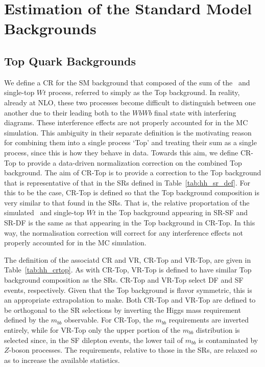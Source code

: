 \section{Estimation of the Standard Model Backgrounds}
\label{sec:hh_background_estimate}

%
%

\subsection{Top Quark Backgrounds}
\label{sec:cr_top}

We define a CR for the SM background that composed of the sum of the \ttbar~and single-top $Wt$
process, referred to simply as the Top background.
In reality, already at NLO, these two processes become difficult to distinguish between one another
due to their leading both to the $WbWb$ final state with interfering diagrams.
These interference effects are not properly accounted for in the MC simulation.
This ambiguity in their separate definition is the motivating reason for combining them into a single
process `Top' and treating their sum as a single process, since this is how they behave in data.
Towards this aim, we define CR-Top to provide a data-driven normalization correction on the combined Top
background.
The aim of CR-Top is to provide a correction to the Top background that is representative of that in the SRs
defined in Table~\ref{tab:hh_sr_def}.
For this to be the case, CR-Top is defined so that the Top background composition is very similar to that
found in the SRs.
That is, the relative proportation of the simulated \ttbar~and single-top $Wt$ in the Top background appearing
in SR-SF and SR-DF is the same as that appearing in the Top background in CR-Top.
In this way, the normalisation correction will correct for any interference effects not properly accounted for
in the MC simulation.

The definition of the associatd CR and VR, CR-Top and VR-Top, are given in Table~\ref{tab:hh_crtop}.
As with CR-Top, VR-Top is defined to have similar Top background composition as the SRs.
CR-Top and VR-Top select DF and SF events, respectively.
Given that the Top background is flavor symmetric, this is an appropriate extrapolation to make.
Both CR-Top and VR-Top are defined to be orthogonal to the SR selections by inverting the Higgs mass requirement
defined by the $m_{bb}$ observable.
For CR-Top, the $m_{bb}$ requirements are inverted entirely, while for VR-Top only the upper portion of the $m_{bb}$
distribution is selected since, in the SF dilepton events, the lower tail of $m_{bb}$ is contaminated by $Z$-boson
processes.
The \dhh requirements, relative to those in the SRs, are relaxed so as to increase the available statistics.


